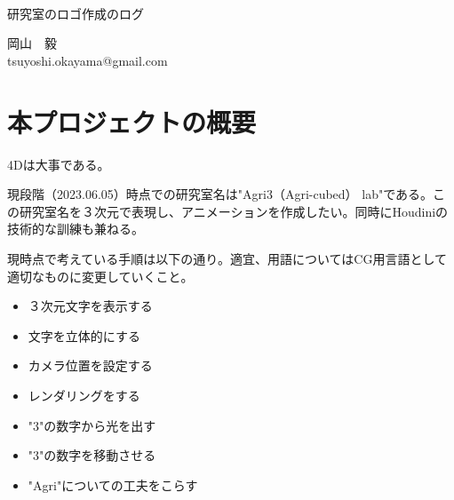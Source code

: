 \documentclass[uplatex,dvipdfmx]{jsarticle}
\begin{document}
\begin{titlepage}
  \noindent %
  \\ \\ \\ \\ \\ \\ \\ \\ 
  \begin{center}
  \begin{LARGE}
  
    研究室のロゴ作成のログ

  \end{LARGE}
  \end{center}
  \vspace{7cm}
  \begin{center}
  \begin{LARGE}
  岡山　毅\\
  tsuyoshi.okayama@gmail.com
  \end{LARGE}
  \end{center}
\end{titlepage}
\newpage

\tableofcontents
\newpage

\section{本プロジェクトの概要}

4Dは大事である\cite{Schunck2021}。

現段階（2023.06.05）時点での研究室名は"Agri3（Agri-cubed） lab"である。この研究室名を３次元で表現し、アニメーションを作成したい。同時にHoudiniの技術的な訓練も兼ねる。

現時点で考えている手順は以下の通り。適宜、用語についてはCG用言語として適切なものに変更していくこと。

\bigskip
\begin{itemize}
  \item ３次元文字を表示する
  \item 文字を立体的にする
  \item カメラ位置を設定する
  \item レンダリングをする
  \item "3"の数字から光を出す
  \item "3"の数字を移動させる
  \item "Agri"についての工夫をこらす
\end{itemize}
\end{document}
